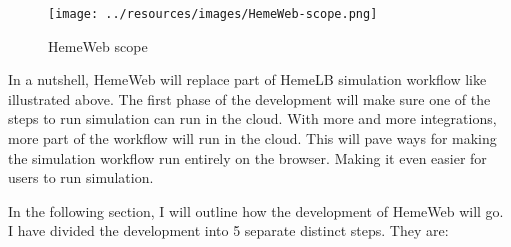 \documentclass[]{article}
\begin{document}
\begin{figure}[H]
\centering
\texttt{[image: ../resources/images/HemeWeb-scope.png]}
\caption{HemeWeb scope}
\end{figure}

In a nutshell, HemeWeb will replace part of HemeLB simulation workflow
like illustrated above. The first phase of the development will make
sure one of the steps to run simulation can run in the cloud. With more
and more integrations, more part of the workflow will run in the cloud.
This will pave ways for making the simulation workflow run entirely on
the browser. Making it even easier for users to run simulation.

In the following section, I will outline how the development of HemeWeb
will go. I have divided the development into 5 separate distinct steps.
They are:
\end{document}
